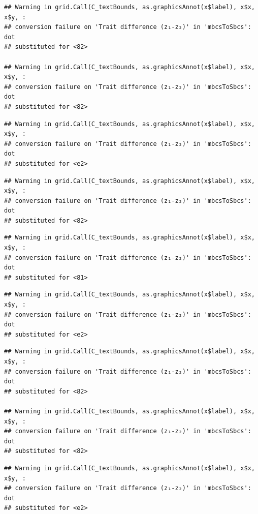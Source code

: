 \documentclass[]{article}
\begin{document}
\begin{verbatim}
## Warning in grid.Call(C_textBounds, as.graphicsAnnot(x$label), x$x, x$y, :
## conversion failure on 'Trait difference (z₁-z₂)' in 'mbcsToSbcs': dot
## substituted for <82>

## Warning in grid.Call(C_textBounds, as.graphicsAnnot(x$label), x$x, x$y, :
## conversion failure on 'Trait difference (z₁-z₂)' in 'mbcsToSbcs': dot
## substituted for <82>
\end{verbatim}

\begin{verbatim}
## Warning in grid.Call(C_textBounds, as.graphicsAnnot(x$label), x$x, x$y, :
## conversion failure on 'Trait difference (z₁-z₂)' in 'mbcsToSbcs': dot
## substituted for <e2>
\end{verbatim}

\begin{verbatim}
## Warning in grid.Call(C_textBounds, as.graphicsAnnot(x$label), x$x, x$y, :
## conversion failure on 'Trait difference (z₁-z₂)' in 'mbcsToSbcs': dot
## substituted for <82>
\end{verbatim}

\begin{verbatim}
## Warning in grid.Call(C_textBounds, as.graphicsAnnot(x$label), x$x, x$y, :
## conversion failure on 'Trait difference (z₁-z₂)' in 'mbcsToSbcs': dot
## substituted for <81>
\end{verbatim}

\begin{verbatim}
## Warning in grid.Call(C_textBounds, as.graphicsAnnot(x$label), x$x, x$y, :
## conversion failure on 'Trait difference (z₁-z₂)' in 'mbcsToSbcs': dot
## substituted for <e2>
\end{verbatim}

\begin{verbatim}
## Warning in grid.Call(C_textBounds, as.graphicsAnnot(x$label), x$x, x$y, :
## conversion failure on 'Trait difference (z₁-z₂)' in 'mbcsToSbcs': dot
## substituted for <82>

## Warning in grid.Call(C_textBounds, as.graphicsAnnot(x$label), x$x, x$y, :
## conversion failure on 'Trait difference (z₁-z₂)' in 'mbcsToSbcs': dot
## substituted for <82>
\end{verbatim}

\begin{verbatim}
## Warning in grid.Call(C_textBounds, as.graphicsAnnot(x$label), x$x, x$y, :
## conversion failure on 'Trait difference (z₁-z₂)' in 'mbcsToSbcs': dot
## substituted for <e2>
\end{verbatim}
\end{document}
